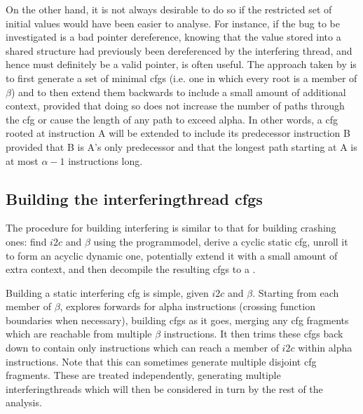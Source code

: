 On the other hand, it is not always desirable to do so
if the restricted set of initial values would have been easier to
analyse.  For instance, if the bug to be investigated is a bad pointer
dereference, knowing that the value stored into a shared structure had
previously been dereferenced by the interfering thread, and hence must
definitely be a valid pointer, is often useful.  The approach taken by
{\implementation} is to first generate a set of minimal \glspl{cfg}
(i.e. one in which every root is a member of $\beta$) and to then
extend them backwards to include a small amount of additional context,
provided that doing so does not increase the number of paths through
the \gls{cfg} or cause the length of any path to exceed \gls{alpha}.
In other words, a \gls{cfg} rooted at instruction A
will be extended to include its predecessor instruction B provided
that B is A's only predecessor and that the longest path starting at A
is at most $\alpha - 1$ instructions long.  

\subsection[Building the \glsentrytext{interferingthread} \glsentrytext{cfg}s]{Building the \gls{interferingthread} \glspl{cfg}}

The procedure for building interfering {\StateMachines} is similar to
that for building crashing ones: find $i2c$ and $\beta$ using the
\gls{programmodel}, derive a cyclic static \gls{cfg}, unroll it to
form an acyclic dynamic one, potentially extend it with a small amount
of extra context, and then decompile the resulting \glspl{cfg} to a
{\StateMachine}.

Building a static interfering \gls{cfg} is simple, given $i2c$ and
$\beta$.  Starting from each member of $\beta$, {\technique} explores
forwards for \gls{alpha} instructions (crossing function boundaries
when necessary), building \glspl{cfg} as it goes, merging any
\gls{cfg} fragments which are reachable from multiple $\beta$
instructions.  It then trims these \glspl{cfg} back down to contain
only instructions which can reach a member of $i2c$ within \gls{alpha}
instructions.  Note that
this can sometimes generate multiple disjoint \gls{cfg} fragments.
These are treated independently, generating multiple
\glspl{interferingthread} which will then be considered in turn by the
rest of the analysis.

